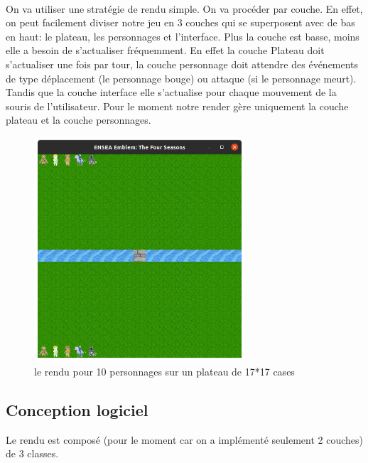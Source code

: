 \documentclass[a4paper,12pt]{article}
\begin{document}
\paragraph{} On va utiliser une stratégie de rendu simple. On va procéder par couche. En effet, on peut facilement diviser notre jeu en 3 couches qui se superposent avec de bas en haut: le plateau, les personnages et l'interface. Plus la couche est basse, moins elle a besoin de s'actualiser fréquemment. En effet la couche Plateau doit s'actualiser une fois par tour, la couche personnage doit attendre des événements de type déplacement (le personnage bouge) ou attaque (si le personnage meurt). Tandis que la couche interface elle s'actualise pour chaque mouvement de la souris de l'utilisateur. Pour le moment notre render gère uniquement la couche plateau et la couche personnages.

\begin{figure}[ht]
\begin{center}
\includegraphics[width=0.7\textwidth]{render.png}
\caption{\label{pacmangame}le rendu pour 10 personnages sur un plateau de 17*17 cases}
\end{center}
\end{figure}
\newpage
\subsection{Conception logiciel}

Le rendu est composé (pour le moment car on a implémenté seulement 2 couches) de 3 classes.  
\end{document}
